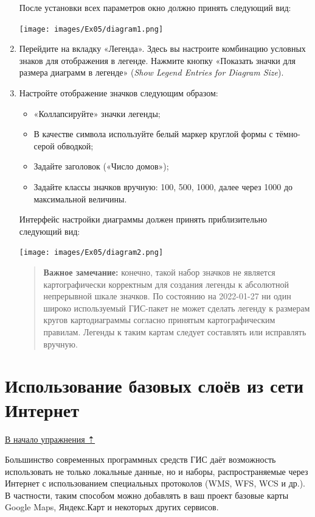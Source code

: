 \documentclass[
  12pt,
]{book}
\providecommand{\tightlist}{%
  \setlength{\itemsep}{0pt}\setlength{\parskip}{0pt}}
\begin{document}
\begin{enumerate}
  После установки всех параметров окно должно принять следующий вид:

  \texttt{[image: images/Ex05/diagram1.png]}
\item
  Перейдите на вкладку «Легенда». Здесь вы настроите комбинацию условных знаков для отображения в легенде. Нажмите кнопку «Показать значки для размера диаграмм в легенде» (\emph{Show Legend Entries for Diagram Size}).
\item
  Настройте отображение значков следующим образом:

  \begin{itemize}
  \tightlist
  \item
    «Коллапсируйте» значки легенды;
  \item
    В качестве символа используйте белый маркер круглой формы с тёмно-серой обводкой;
  \item
    Задайте заголовок («Число домов»);
  \item
    Задайте классы значков вручную: 100, 500, 1000, далее через 1000 до максимальной величины.
  \end{itemize}

  Интерфейс настройки диаграммы должен принять приблизительно следующий вид:

  \texttt{[image: images/Ex05/diagram2.png]}

  \begin{quote}
  \textbf{Важное замечание:} конечно, такой набор значков не является картографически корректным для создания легенды к абсолютной непрерывной шкале значков. По состоянию на 2022-01-27 ни один широко используемый ГИС-пакет не может сделать легенду к размерам кругов картодиаграммы согласно принятым картографическим правилам. Легенды к таким картам следует составлять или исправлять вручную.
  \end{quote}
\end{enumerate}

\hypertarget{map-ref-districts-wms}{%
\section{Использование базовых слоёв из сети Интернет}\label{map-ref-districts-wms}}

\protect\hyperlink{map-ref-districts}{В начало упражнения ⇡}

Большинство современных программных средств ГИС даёт возможность использовать не только локальные данные, но и наборы, распространяемые через Интернет с использованием специальных протоколов (WMS, WFS, WCS и др.). В частности, таким способом можно добавлять в ваш проект базовые карты Google Maps, Яндекс.Карт и некоторых других сервисов.
\end{document}
